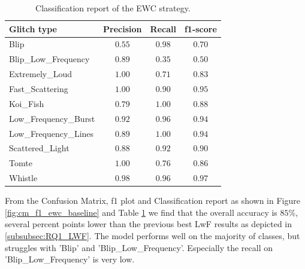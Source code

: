 \begin{table}[ht]
\centering
    \begin{tabular}{|l|c c c|}
    \hline
    \textbf{Glitch type} & \textbf{Precision} & \textbf{Recall} & \textbf{f1-score} \\ \hline
    Blip & $0.55$ & $0.98$ & $0.70$ \\
    Blip\_Low\_Frequency & $0.89$ & $0.35$ & $0.50$\\
    Extremely\_Loud & $1.00$ & $0.71$ &  $0.83$\\
    Fast\_Scattering & $1.00$ & $0.90$ &  $0.95$\\
    Koi\_Fish & $0.79$ & $1.00$ & $0.88$\\
    Low\_Frequency\_Burst & $0.92$ & $0.96$ & $0.94$\\
    Low\_Frequency\_Lines & $0.89$ & $1.00$ & $0.94$\\
    Scattered\_Light & $0.88$ & $0.92$ &$0.90$ \\
    Tomte & $1.00$ & $0.76$ & $0.86$ \\
    Whistle & $0.98$ & $0.96$ & $0.97$ \\
    \hline
    \end{tabular}
    \caption{Classification report of the EWC strategy.}
    \label{tbl:RQ1_class_report_ewc}
\end{table}


From the Confusion Matrix, f1 plot and Classification report as shown in Figure \ref{fig:cm_f1_ewc_baseline} and Table \ref{tbl:RQ1_class_report_ewc} we find that the overall accuracy is $85 \%$, several percent points lower than the previous best LwF results as depicted in \ref{subsubsec:RQ1_LWF}. The model performs well on the majority of classes, but struggles with 'Blip' and 'Blip\_Low\_Frequency'. Especially the recall on 'Blip\_Low\_Frequency' is very low.

\newpage
